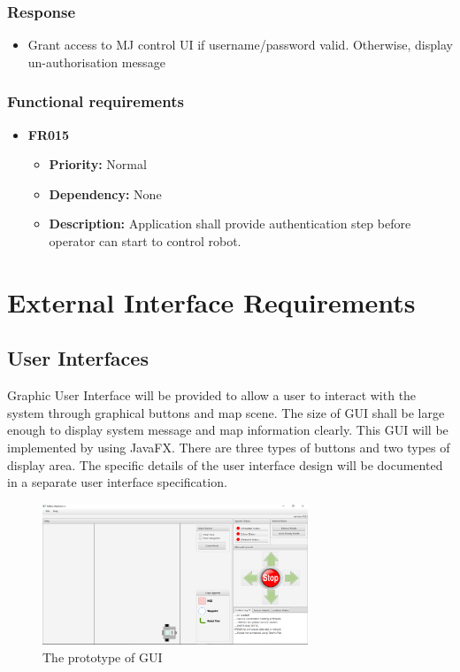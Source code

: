 \documentclass[10pt,a4paper,titlepage]{article}
\begin{document}
	\subsubsection*{Response}
	\begin{itemize}
		\item Grant access to MJ control UI if username/password valid. Otherwise, display un-authorisation message
	\end{itemize}
	
	\subsubsection{Functional requirements}
	\begin{itemize}
		\item \textbf{FR015}
		\begin{itemize}
			\item \textbf{Priority:} Normal
			\item \textbf{Dependency:} None
			\item \textbf{Description:} Application shall provide authentication step before operator can start to control robot.
		\end{itemize} 
		
	\end{itemize}
	\newpage
	\section{External Interface Requirements}
	\subsection{User Interfaces}
	Graphic User Interface will be provided to allow a user to interact with the system through graphical buttons and map scene. The size of GUI shall be large enough to display system message and map information clearly. This GUI will be implemented by using JavaFX. There are three types of buttons and two types of display area. The specific details of the user interface design will be documented in a separate user interface specification. 
	
	\begin{figure}[H]
		\centering
		\includegraphics[width=300px]{GUI.PNG}
		\caption{The prototype of GUI}
		\label{fig:GUI}
	\end{figure}
	
\end{document}
